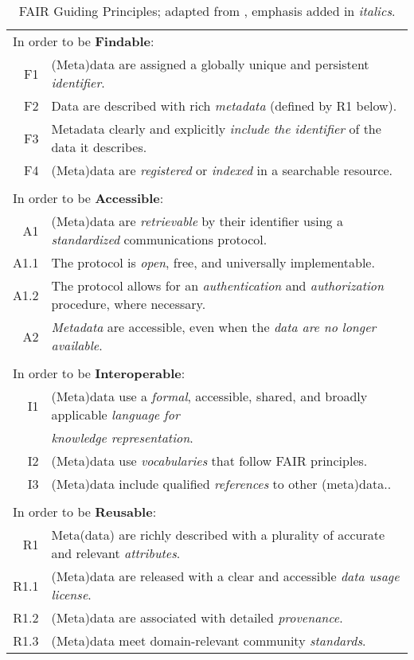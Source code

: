 \begin{table}[htp]
\small
\begin{tabular}{|r l|}
    \hline
    \multicolumn{2}{|l|}{In order to be \textbf{Findable}:} \\
    F1 & (Meta)data are assigned a globally unique and persistent \emph{identifier}. \\
    F2 & Data are described with rich \emph{metadata} (defined by R1 below). \\
    F3 & Metadata clearly and explicitly \emph{include the identifier} of the data it describes. \\
    F4 & (Meta)data are \emph{registered} or \emph{indexed} in a searchable resource. \\
    & \\
     \multicolumn{2}{|l|}{In order to be \textbf{Accessible}:} \\


    A1 & (Meta)data are \emph{retrievable} by their identifier using a 
        \emph{standardized} communications protocol. \\
    A1.1 & The protocol is \emph{open}, free, and universally implementable. \\
    A1.2 & The protocol allows for an \emph{authentication} and  
            \emph{authorization} procedure, where necessary. \\
     A2 & \emph{Metadata} are accessible, even when the \emph{data are no longer available}. \\

     & \\
     \multicolumn{2}{|l|}{In order to be \textbf{Interoperable}:} \\
     I1 & 
     (Meta)data use a \emph{formal}, accessible, shared, and 
         broadly applicable \emph{language for} \\
        &  \emph{knowledge representation}. \\
     I2 & (Meta)data use \emph{vocabularies} that follow FAIR principles. \\
     I3 & (Meta)data include qualified \emph{references} to other (meta)data.. \\

     & \\
     \multicolumn{2}{|l|}{In order to be \textbf{Reusable}:} \\
     R1 & Meta(data) are richly described with a plurality of 
         accurate and relevant \emph{attributes}. \\
            R1.1 & (Meta)data are released with a clear and accessible \emph{data usage license}. \\
            R1.2 & (Meta)data are associated with detailed \emph{provenance}. \\
            R1.3 & (Meta)data meet domain-relevant community \emph{standards}. \\
    \hline

\end{tabular}
\caption{FAIR Guiding Principles; adapted from \cite{Wilkinson 2016}, emphasis added in \emph{italics}.}
\label{ch10:fair}
\end{table}

